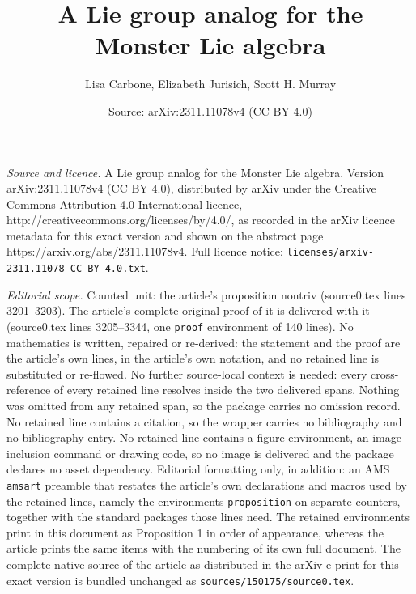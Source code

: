 \documentclass[10pt,a4paper]{amsart}
\title{A Lie group analog for the Monster Lie algebra}
\author{Lisa Carbone, Elizabeth Jurisich, Scott H. Murray}
\date{Source: arXiv:2311.11078v4 (CC BY 4.0)}
\begin{document}
\maketitle

\noindent\emph{Source and licence.} A Lie group analog for the Monster Lie algebra. Version arXiv:2311.11078v4 (CC BY 4.0), distributed by arXiv under the Creative Commons Attribution 4.0 International licence, http://creativecommons.org/licenses/by/4.0/, as recorded in the arXiv licence metadata for this exact version and shown on the abstract page https://arxiv.org/abs/2311.11078v4. Full licence notice: \texttt{licenses/arxiv-2311.11078-CC-BY-4.0.txt}.\par\smallskip

\noindent\textit{Editorial scope.} Counted unit: the article's proposition nontriv (source0.tex lines 3201--3203). The article's complete original proof of it is delivered with it (source0.tex lines 3205--3344, one \texttt{proof} environment of 140 lines). No mathematics is written, repaired or re-derived: the statement and the proof are the article's own lines, in the article's own notation, and no retained line is substituted or re-flowed.  No further source-local context is needed: every cross-reference of every retained line resolves inside the two delivered spans.  Nothing was omitted from any retained span, so the package carries no omission record.  No retained line contains a citation, so the wrapper carries no bibliography and no bibliography entry.  No retained line contains a figure environment, an image-inclusion command or drawing code, so no image is delivered and the package declares no asset dependency.  Editorial formatting only, in addition: an AMS \texttt{amsart} preamble that restates the article's own declarations and macros used by the retained lines, namely the environments \texttt{proposition} on separate counters, together with the standard packages those lines need.  The retained environments print in this document as Proposition 1 in order of appearance, whereas the article prints the same items with the numbering of its own full document.  The complete native source of the article as distributed in the arXiv e-print for this exact version is bundled unchanged as \texttt{sources/150175/source0.tex}.
\end{document}
